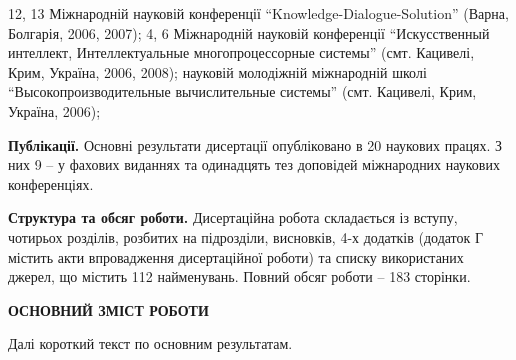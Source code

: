 12, 13 Міжнародній науковій конференції ``Knowledge-Dialogue-Solution'' (Вар\-на, Болгарія, 2006, 2007);
4, 6 Міжнародній науковій конференції ``Искусственный интеллект, Ин\-те\-ллек\-ту\-аль\-ные многопроцессорные системы'' (смт. Ка\-ци\-ве\-лі, Крим, Україна, 2006, 2008);
науковій молодіжній міжнародній школі ``Высокопроизводительные вычислительные системы'' (смт. Кацивелі, Крим, Україна, 2006);


\textbf{Публікації.}
Основні результати дисертації опубліковано в 20 наукових працях. З них 9 -- у фахових виданнях та одинадцять тез доповідей міжнародних наукових конференціях.

\textbf{Структура та обсяг роботи.}
Дисертаційна робота складається із вступу, чотирьох розділів, розбитих на підрозділи, висновків, 4-х додатків (додаток Г містить акти впровадження дисертаційної роботи) та списку використаних джерел, що містить 112 найменувань. Повний обсяг роботи -- 183 сторінки. 

\vspace{1em}
\begin{center}
\textbf{ОСНОВНИЙ ЗМІСТ РОБОТИ}
\end{center}

Далі короткий текст по основним результатам.